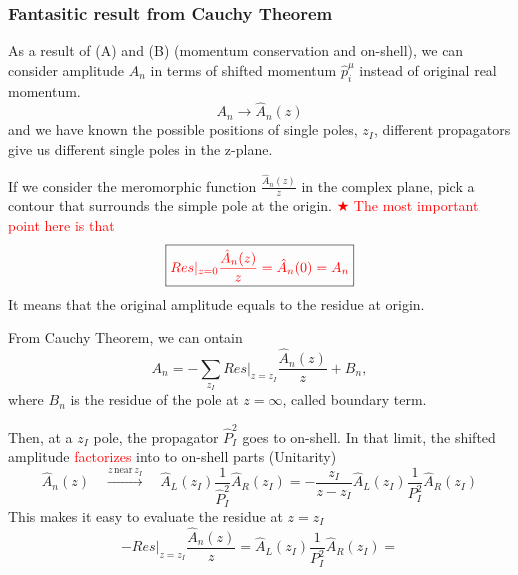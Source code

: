 \documentclass{beamer}
\begin{document}
\begin{frame}
    \frametitle{Fantasitic result from Cauchy Theorem}
    As a result of (A) and (B) (momentum conservation and on-shell), we can consider amplitude $A_n$ in terms of shifted momentum $\hat{p}_i^\mu$ instead of
    original real momentum. 
    \begin{equation*}
        A_n \longrightarrow \hat{A}_n(z)
    \end{equation*}
    and we have known the possible positions of single poles, $z_I$, different propagators give 
    us different single poles in the z-plane. 
    \par
    If we consider the meromorphic function $\frac{\hat{A}_n(z)}{z}$ in the complex plane, pick a contour that surrounds the simple pole at the origin. 
    \textcolor{red}{$\bigstar$ The most important point here is that}
    \begin{equation*}
        \boxed{\color{red}Res|_{z=0}\frac{\hat{A}_n(z)}{z}=\hat{A}_n(0)=A_n}
    \end{equation*}
    It means that the original amplitude equals to the residue at origin.
\end{frame}
\begin{frame}
    From Cauchy Theorem, we can ontain
    \begin{equation*}
        A_n=-\sum_{z_I}Res|_{z=z_I}\frac{\hat{A}_n(z)}{z}+B_n,
    \end{equation*}
    where $B_n$ is the residue of the pole at $z=\infty$, called boundary term.

    Then, at a $z_I$ pole, the propagator $\hat{P}_I^2$ goes to on-shell. In that limit, the shifted amplitude
    \textcolor{red}{factorizes} into to on-shell parts (Unitarity)
    \begin{equation*}
        \hat{A}_n(z)\quad \xrightarrow{z\,\text{near}\,z_I} \quad \hat{A}_L(z_I)\frac{1}{\hat{P}_I^2}\hat{A}_R(z_I)= - \frac{z_I}{z-z_I}\hat{A}_L(z_I)\frac{1}{P_I^2}\hat{A}_R(z_I)
    \end{equation*}
    This makes it easy to evaluate the residue at $z=z_I$
    \begin{equation*}
        -Res|_{z=z_I}\frac{\hat{A}_n(z)}{z}=\hat{A}_L(z_I)\frac{1}{P_I^2}\hat{A}_R(z_I)=
    \end{equation*}
\end{frame}
\end{document}
